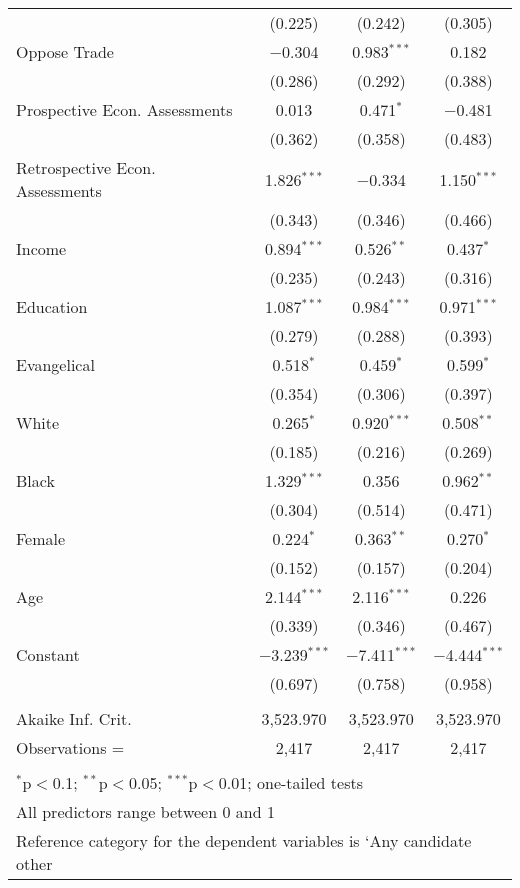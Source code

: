 \documentclass[12pt]{article}
\begin{document}
\begin{appendices}
\begin{refsection}
\begin{table}[!t]
\begin{adjustbox}{width=0.6\textwidth,center}
\begin{tabular}{@{\extracolsep{5pt}}lccc}
  & (0.225) & (0.242) & (0.305) \\ 
 Oppose Trade & $-$0.304 & 0.983$^{***}$ & 0.182 \\ 
  & (0.286) & (0.292) & (0.388) \\ 
 Prospective Econ. Assessments & 0.013 & 0.471$^{*}$ & $-$0.481 \\ 
  & (0.362) & (0.358) & (0.483) \\ 
 Retrospective Econ. Assessments & 1.826$^{***}$ & $-$0.334 & 1.150$^{***}$ \\ 
  & (0.343) & (0.346) & (0.466) \\ 
 Income & 0.894$^{***}$ & 0.526$^{**}$ & 0.437$^{*}$ \\ 
  & (0.235) & (0.243) & (0.316) \\ 
 Education & 1.087$^{***}$ & 0.984$^{***}$ & 0.971$^{***}$ \\ 
  & (0.279) & (0.288) & (0.393) \\ 
 Evangelical & 0.518$^{*}$ & 0.459$^{*}$ & 0.599$^{*}$ \\ 
  & (0.354) & (0.306) & (0.397) \\ 
 White & 0.265$^{*}$ & 0.920$^{***}$ & 0.508$^{**}$ \\ 
  & (0.185) & (0.216) & (0.269) \\ 
 Black & 1.329$^{***}$ & 0.356 & 0.962$^{**}$ \\ 
  & (0.304) & (0.514) & (0.471) \\ 
 Female & 0.224$^{*}$ & 0.363$^{**}$ & 0.270$^{*}$ \\ 
  & (0.152) & (0.157) & (0.204) \\ 
 Age & 2.144$^{***}$ & 2.116$^{***}$ & 0.226 \\ 
  & (0.339) & (0.346) & (0.467) \\ 
 Constant & $-$3.239$^{***}$ & $-$7.411$^{***}$ & $-$4.444$^{***}$ \\ 
  & (0.697) & (0.758) & (0.958) \\ 
\hline \\[-1.8ex] 
Akaike Inf. Crit. & 3,523.970 & 3,523.970 & 3,523.970 \\ 
Observations =  & 2,417 & 2,417 & 2,417 \\
\hline 
\hline \\[-1.8ex] 
\multicolumn{4}{l}{\footnotesize $^{*}$p$<$0.1; $^{**}$p$<$0.05; $^{***}$p$<$0.01; one-tailed tests} \\ 
\multicolumn{4}{l}{\footnotesize All predictors range between 0 and 1} \\
\multicolumn{4}{l}{\footnotesize Reference category for the dependent variables is `Any candidate other} \\

\end{tabular}
\end{adjustbox}
\end{table}
\end{refsection}
\end{appendices}
\end{document}

